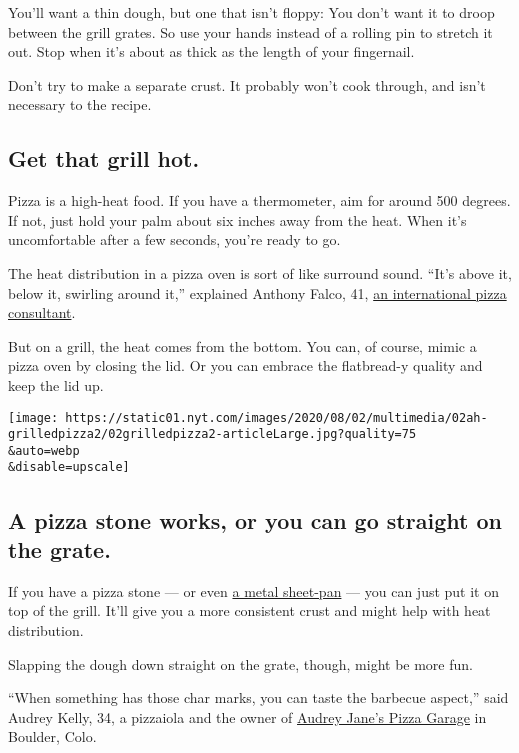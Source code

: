 You'll want a thin dough, but one that isn't floppy: You don't want it
to droop between the grill grates. So use your hands instead of a
rolling pin to stretch it out. Stop when it's about as thick as the
length of your fingernail.

Don't try to make a separate crust. It probably won't cook through, and
isn't necessary to the recipe.

\hypertarget{get-that-grill-hot}{%
\subsection{Get that grill hot.}\label{get-that-grill-hot}}

Pizza is a high-heat food. If you have a thermometer, aim for around 500
degrees. If not, just hold your palm about six inches away from the
heat. When it's uncomfortable after a few seconds, you're ready to go.

The heat distribution in a pizza oven is sort of like surround sound.
``It's above it, below it, swirling around it,'' explained Anthony
Falco, 41, \href{https://www.piz.za.com/}{an international pizza
consultant}.

But on a grill, the heat comes from the bottom. You can, of course,
mimic a pizza oven by closing the lid. Or you can embrace the
flatbread-y quality and keep the lid up.

\texttt{[image: https://static01.nyt.com/images/2020/08/02/multimedia/02ah-grilledpizza2/02grilledpizza2-articleLarge.jpg?quality=75\\\&auto=webp\\\&disable=upscale]}

\hypertarget{a-pizza-stone-works-or-you-can-go-straight-on-the-grate}{%
\subsection{A pizza stone works, or you can go straight on the
grate.}\label{a-pizza-stone-works-or-you-can-go-straight-on-the-grate}}

If you have a pizza stone --- or even
\href{https://cooking.nytimes.com/recipes/1020233-sheet-pan-pizza-with-asparagus-and-arugula}{a
metal sheet-pan} --- you can just put it on top of the grill. It'll give
you a more consistent crust and might help with heat distribution.

Slapping the dough down straight on the grate, though, might be more
fun.

``When something has those char marks, you can taste the barbecue
aspect,'' said Audrey Kelly, 34, a pizzaiola and the owner of
\href{https://www.thepizzagarage.com/}{Audrey Jane's Pizza Garage} in
Boulder, Colo.

